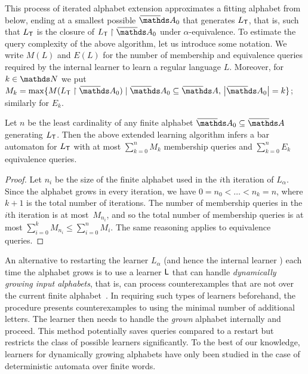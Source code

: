 \documentclass[a4paper,UKenglish,cleveref,autoref,thm-restate,numberwithinsect,final]{lipics-v2021}
\begin{document}
    This process of iterated alphabet extension approximates a fitting alphabet from below, ending at a smallest possible $\barNames_0$ that generates $L_\textsf{T}$, that is, such that $L_\textsf{T}$ is the closure of $L_\teach\restriction \barNames_0$ under $\alpha$-equivalence. To estimate the query complexity of the above algorithm, let us introduce some notation. We write $M(L)$ and $E(L)$ for the number of membership and equivalence queries required by the internal learner \learn to learn a regular language $L$. Moreover, for $k\in \Nat$ we put $M_k = \max \set{M(L_\teach \restriction \barNames_0) \mid \barNames_0\seq \barNames,\, \card{\barNames_0}=k}$; similarly for $E_k$.
\begin{theorem}[Correctness]
Let $n$ be the least cardinality of any finite alphabet $\barNames_0\seq \barNames$ generating $L_\textsf{T}$. Then the above extended learning algorithm infers a bar automaton for $L_\textsf{T}$ with at most $\sum_{k = 0}^n M_k$ membership queries and $\sum_{k = 0}^n E_k$ 
equivalence queries.
    \end{theorem}

\begin{proof}
Let $n_i$ be the size of the finite alphabet used in the $i$th iteration of $L_\alpha$. Since the alphabet grows in every iteration, we have $0=n_0<\ldots<n_k=n$, where $k+1$ is the total number of iterations. The number of membership queries in the $i$th iteration is at most~$M_{n_i}$, and so the total number of membership queries is at most $\sum_{i=0}^k M_{n_i} \leq \sum_{i=0}^n M_i$. The same reasoning applies to equivalence queries.
\end{proof}

    \begin{rem}
        An alternative to restarting the learner $L_\alpha$ (and hence the internal learner \learn) each time the alphabet  grows is to use a learner $\textsf{L}$ that can handle \emph{dynamically growing input alphabets}, that is,
        can process counterexamples that are not over the current finite alphabet~\cite{ihs13}. In requiring such types
        of learners beforehand, the \tass procedure presents counterexamples to \learn using the minimal number of
        additional letters. The learner \learn then
        needs to handle the \emph{grown} alphabet internally and proceed. This method potentially saves queries compared to a  restart but restricts the class of
        possible learners significantly. To the best of our knowledge, learners for dynamically growing alphabets have only been studied in the case of deterministic automata over finite words.
    \end{rem}
\end{document}
